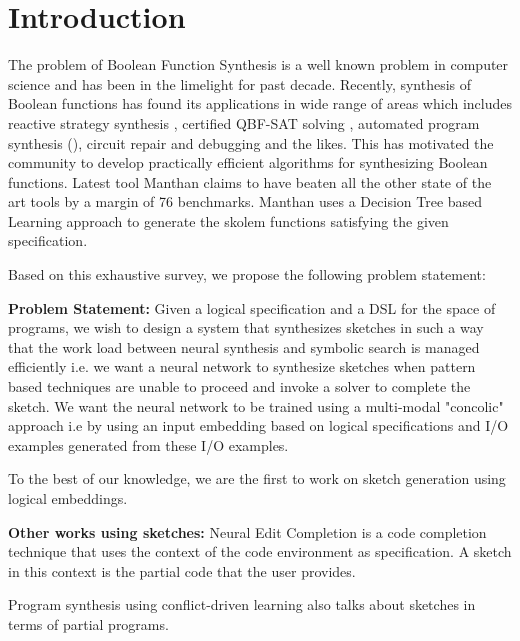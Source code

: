 
\section{Introduction}
\label{sec:intro}

The problem of Boolean Function Synthesis is a well known problem in computer science and has been in the limelight for past decade. Recently, synthesis of Boolean functions has found its applications in wide range of areas which includes reactive strategy synthesis \cite{Alur2005}, certified QBF-SAT solving \cite{Balabnav2012}, 
automated program synthesis (\cite{Solar2013, Gulwani2013}), circuit repair and debugging \cite{Jo} and the likes. This has motivated the community to develop practically efficient algorithms for synthesizing Boolean functions. Latest tool Manthan \cite{Manthan} claims to have beaten all the other state of the art tools by a margin of 76 benchmarks.
Manthan uses a Decision Tree based Learning approach to generate the skolem functions satisfying the given specification.

\noindent Based on this exhaustive survey, we propose the following problem statement:

\noindent\textbf{Problem Statement:} Given a logical specification and a DSL for the space of programs, we wish to design a system that synthesizes sketches in such a way that the work load between neural synthesis and symbolic search is managed efficiently i.e. we want a neural network to synthesize sketches when pattern based techniques are unable to proceed and invoke a solver to complete the sketch. We want the neural network to be trained using a multi-modal "concolic" approach i.e by using an input embedding based on logical specifications and I/O examples generated from these I/O examples.

To the best of our knowledge, we are the first to work on sketch generation using logical embeddings.

\smallskip
\noindent\textbf{Other works using sketches: } 
Neural Edit Completion is a code completion technique that uses the context of the code environment as specification. A sketch in this context is the partial code that the user provides.

Program synthesis using conflict-driven learning also talks about sketches in terms of partial programs. 

